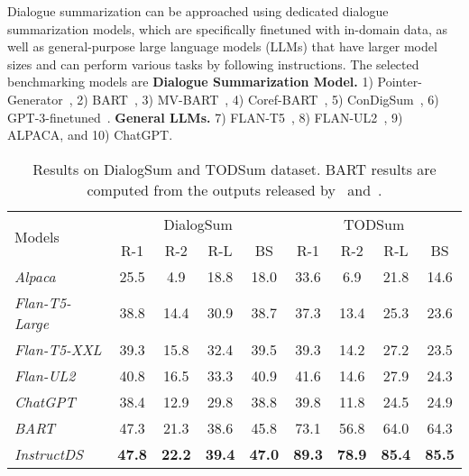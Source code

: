 \documentclass[11pt]{article}
\begin{document}
        Dialogue summarization can be approached using dedicated dialogue summarization models, which are specifically finetuned with in-domain data, as well as general-purpose large language models (LLMs) that have larger model sizes and can perform various tasks by following instructions. The selected benchmarking models are \textbf{Dialogue Summarization Model.} 1) Pointer-Generator~\cite{see-etal-2017-get}, 2) BART~\cite{lewis-etal-2020-bart}, 3) MV-BART~\cite{chen-yang-2020-multi}, 4) Coref-BART~\cite{liu-etal-2021-coreference}, 5) ConDigSum~\cite{liu-etal-2021-topic-aware}, 6) GPT-3-finetuned~\cite{hu2022lora}. \textbf{General LLMs.} 7) FLAN-T5~\cite{chung2022scaling}, 8) FLAN-UL2~\cite{tay2022ul2}, 9) ALPACA, and 10) ChatGPT.

\begin{table*}[t]
        \centering
        \begin{adjustbox}{width=0.82\textwidth,center}
        \begin{tabular}{ | l | c  c  c  c | c  c  c  c | }
        \toprule
        \multirow{2}{*}{Models} & \multicolumn{4}{c|}{DialogSum} & \multicolumn{4}{c|}{TODSum}\\ \cline{2-9}
         & R-1 & R-2 & R-L & BS & R-1 & R-2 & R-L & BS \\
        \hline
        \emph{Alpaca} & 25.5 & 4.9 & 18.8 & 18.0 & 33.6 & 6.9 & 21.8 & 14.6 \\
        \emph{Flan-T5-Large} & 38.8 & 14.4 & 30.9 & 38.7 & 37.3 & 13.4 & 25.3 & 23.6 \\
        \emph{Flan-T5-XXL} & 39.3 & 15.8 & 32.4 & 39.5 & 39.3 & 14.2 & 27.2 & 23.5 \\
        \emph{Flan-UL2} & 40.8 & 16.5 & 33.3 & 40.9 & 41.6 & 14.6 & 27.9 & 24.3 \\
        \emph{ChatGPT} & 38.4 & 12.9 & 29.8 & 38.8 & 39.8 & 11.8 & 24.5 & 24.9 \\
        \emph{BART} & 47.3 & 21.3 & 38.6 & 45.8 & 73.1 & 56.8 & 64.0 & 64.3 \\
        \hline
        \emph{InstructDS} & \textbf{47.8} & \textbf{22.2} & \textbf{39.4} & \textbf{47.0} & \textbf{89.3} & \textbf{78.9} & \textbf{85.4} & \textbf{85.5} \\ 
        \bottomrule
        \end{tabular}
        \end{adjustbox}
        \caption{Results on DialogSum and TODSum dataset. BART results are computed from the outputs released by~\citet{chen-etal-2021-dialogsum} and~\citet{zhao2021todsum}.}
        \label{tab:dialogsum_tod}
    \end{table*}
\end{document}

